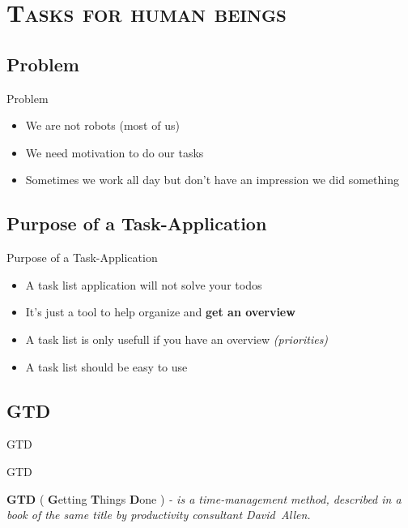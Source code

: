 \documentclass[xcolor=x11names,compress]{beamer}
\renewcommand{\(}{\begin{columns}}
\renewcommand{\)}{\end{columns}}
\newcommand{\<}[1]{\begin{column}{#1}}
\renewcommand{\>}{\end{column}}
\begin{document}
\section{\scshape{Tasks for human beings}}

\subsection{Problem}
\begin{frame}{Problem}
	\begin{itemize}[<+-| alert@+>]
			\item We are not robots (most of us)
			\item We need motivation to do our tasks
			\item Sometimes we work all day but don't have an impression we did something
	\end{itemize}
\end{frame}

\subsection{Purpose of a Task-Application}
\begin{frame}{Purpose of a Task-Application}
	\begin{itemize}[<+-| alert@+>]
			\item A task list application will not solve your todos
			\item It's just a tool to help organize and \textbf{get an overview}
			\item A task list is only usefull if you have an overview \textit{(priorities)}
			\item A task list should be easy to use
	\end{itemize}
\end{frame}

\subsection{GTD}

\begin{frame}{GTD}
 
\end{frame}

\begin{frame}{GTD}
\begin{center}
\textbf{GTD}
\pause
 ( \textbf{G}etting \textbf{T}hings \textbf{D}one )
\pause
\textit{ - is a time-management method, described in a book of the same title by productivity consultant David~Allen. \footnotemark[1]}
\end{center}
\end{frame}
\end{document}
